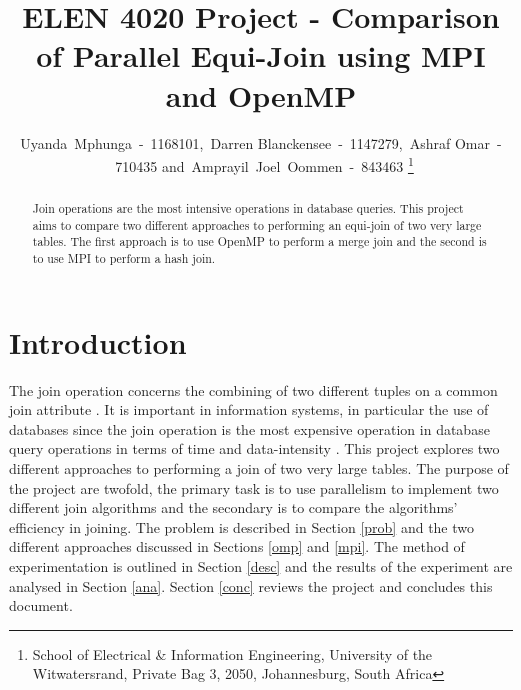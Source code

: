 \documentclass[journal,draftclsnofoot]{IEEEtran}
\begin{document}
\title{ELEN 4020 Project - Comparison of Parallel Equi-Join using MPI and OpenMP}
\author{Uyanda~Mphunga~-~1168101,~Darren Blanckensee~-~1147279,~Ashraf Omar~-~710435 and~Amprayil~Joel~Oommen~-~843463
\thanks{School of Electrical \& Information Engineering, University of the
Witwatersrand, Private Bag 3, 2050, Johannesburg, South Africa}
}
\maketitle
\pagestyle{plain}
\begin{abstract}
Join operations are the most intensive operations in database queries. This project aims to compare two different approaches to performing an equi-join of two very large tables. The first approach is to use OpenMP to perform a merge join and the second is to use MPI to perform a hash join.
\end{abstract}
\section{Introduction}
The join operation concerns the combining of two different tuples on a common join attribute \cite{Yu1998}. It is important in information systems, in particular the use of databases since the join operation is the most expensive operation in database query operations in terms of time and data-intensity \cite{Mishra1992}. This project explores two different approaches to performing a join of two very large tables. The purpose of the project are twofold, the primary task is to use parallelism to implement two different join algorithms and the secondary is to compare the algorithms’ efficiency in joining. The problem is described in Section \ref{prob} and the two different approaches discussed in Sections \ref{omp} and \ref{mpi}. The method of experimentation is outlined in Section \ref{desc} and the results of the experiment are analysed in Section \ref{ana}. Section \ref{conc} reviews the project and concludes this document.
\end{document}
